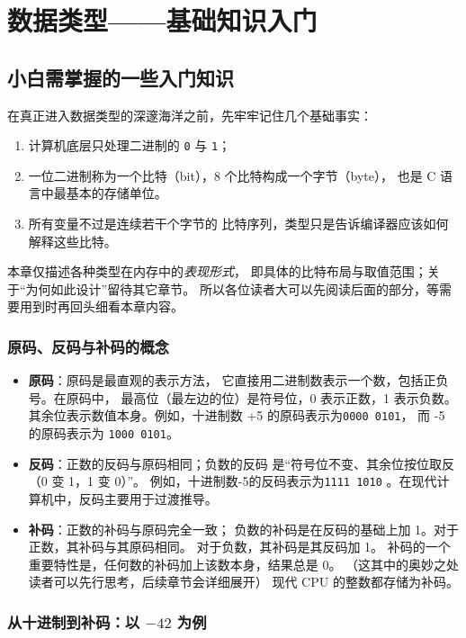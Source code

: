 ﻿
\section{数据类型——基础知识入门}
\subsection{小白需掌握的一些入门知识}

在真正进入数据类型的深邃海洋之前，先牢牢记住几个基础事实：

\begin{enumerate}[label=\ding{\numexpr171+\arabic*}]
 \item 计算机底层只处理二进制的 \texttt{0} 与 \texttt{1}；
 \item 一位二进制称为一个比特（bit），8 个比特构成一个字节（byte），
也是 C 语言中最基本的存储单位。
 \item 所有变量不过是连续若干个字节的
比特序列，类型只是告诉编译器应该如何解释这些比特。
\end{enumerate}


本章仅描述各种类型在内存中的\emph{表现形式}，
即具体的比特布局与取值范围；关于“为何如此设计”留待其它章节。
所以各位读者大可以先阅读后面的部分，等需要用到时再回头细看本章内容。

\subsubsection{原码、反码与补码的概念}
\begin{itemize}
  \item \textbf{原码}：原码是最直观的表示方法，
  它直接用二进制数表示一个数，包括正负号。在原码中，
  最高位（最左边的位）是符号位，0 表示正数，1 表示负数。
  其余位表示数值本身。例如，十进制数 +5 的原码表示为\texttt{0000 0101}，
  而 -5 的原码表示为 \texttt{1000 0101}。
  \item \textbf{反码}：正数的反码与原码相同；负数的反码
  是“符号位不变、其余位按位取反（0 变 1，1 变 0）”。
  例如，十进制数-5的反码表示为\texttt{1111 1010}
  。在现代计算机中，反码主要用于过渡推导。
  \item \textbf{补码}：正数的补码与原码完全一致；
  负数的补码是在反码的基础上加 1。对于正数，其补码与其原码相同。
  对于负数，其补码是其反码加 1。
  补码的一个重要特性是，任何数的补码加上该数本身，结果总是 0。
  （这其中的奥妙之处读者可以先行思考，后续章节会详细展开）
  现代 CPU 的整数都存储为补码。
\end{itemize}

\subsubsection{从十进制到补码：以 $-42$ 为例}

